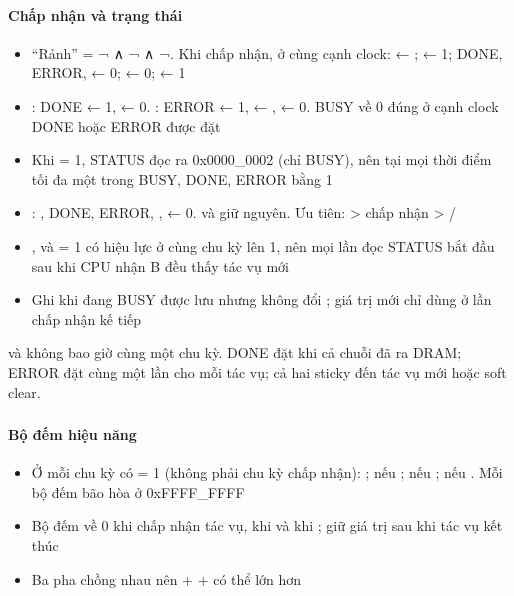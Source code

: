 \documentclass[10pt,a4paper]{article}
\begin{document}
\paragraph{Chấp nhận và trạng thái}\label{par:5-3}
\begin{itemize}
\item “Rảnh” = ¬ ∧ ¬ ∧ ¬. Khi chấp nhận, ở cùng cạnh clock:  ← ;  ← 1; DONE, ERROR,  ← 0;  ← 0;  ← 1
\item {}: DONE ← 1,  ← 0. : ERROR ← 1,  ← ,  ← 0. BUSY về 0 đúng ở cạnh clock DONE hoặc ERROR được đặt
\item Khi  = 1, STATUS đọc ra 0x0000\_0002 (chỉ BUSY), nên tại mọi thời điểm tối đa một trong BUSY, DONE, ERROR bằng 1
\item {}: , DONE, ERROR, ,  ← 0.  và  giữ nguyên. Ưu tiên:  > chấp nhận > /
\item {},  và  = 1 có hiệu lực ở cùng chu kỳ  lên 1, nên mọi lần đọc STATUS bắt đầu sau khi CPU nhận B đều thấy tác vụ mới
\item Ghi  khi đang BUSY được lưu nhưng không đổi ; giá trị mới chỉ dùng ở lần chấp nhận kế tiếp
\end{itemize}

\begin{notebox}
 và  không bao giờ cùng một chu kỳ. DONE đặt khi cả chuỗi đã ra DRAM; ERROR đặt cùng  một lần cho mỗi tác vụ; cả hai sticky đến tác vụ mới hoặc soft clear.
\end{notebox}

\subsubsection{\texorpdfstring{}{gemm\_rf\_perf}}

\paragraph{Bộ đếm hiệu năng}\label{par:5-4}
\begin{itemize}
\item Ở mỗi chu kỳ có  = 1 (không phải chu kỳ chấp nhận): ;  nếu ;  nếu ;  nếu . Mỗi bộ đếm bão hòa ở 0xFFFF\_FFFF
\item Bộ đếm về 0 khi chấp nhận tác vụ, khi  và khi ; giữ giá trị sau khi tác vụ kết thúc
\item Ba pha chồng nhau nên  +  +  có thể lớn hơn 
\end{itemize}
\end{document}
